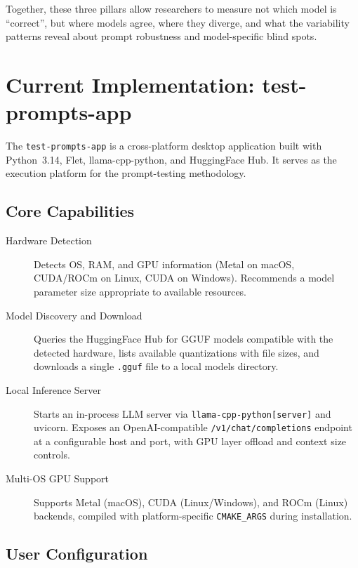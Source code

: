 \documentclass[11pt, a4paper]{article}
\begin{document}
Together, these three pillars allow researchers to measure not which model is
``correct'', but where models agree, where they diverge, and what the variability
patterns reveal about prompt robustness and model-specific blind spots.

\section{Current Implementation: test-prompts-app}

The \texttt{test-prompts-app} is a cross-platform desktop application built
with Python~3.14, Flet, llama-cpp-python, and HuggingFace Hub. It serves as
the execution platform for the prompt-testing methodology.

\subsection{Core Capabilities}

\begin{description}
  \item[Hardware Detection] Detects OS, RAM, and GPU information (Metal on macOS,
        CUDA/ROCm on Linux, CUDA on Windows). Recommends a model parameter size
        appropriate to available resources.

  \item[Model Discovery and Download] Queries the HuggingFace Hub for GGUF
        models compatible with the detected hardware, lists available
        quantizations with file sizes, and downloads a single \texttt{.gguf}
        file to a local models directory.

  \item[Local Inference Server] Starts an in-process LLM server via
        \texttt{llama-cpp-python[server]} and uvicorn. Exposes an
        OpenAI-compatible \texttt{/v1/chat/completions} endpoint at a
        configurable host and port, with GPU layer offload and context size
        controls.

  \item[Multi-OS GPU Support] Supports Metal (macOS), CUDA (Linux/Windows),
        and ROCm (Linux) backends, compiled with platform-specific
        \texttt{CMAKE\_ARGS} during installation.
\end{description}

\subsection{User Configuration}
\end{document}
